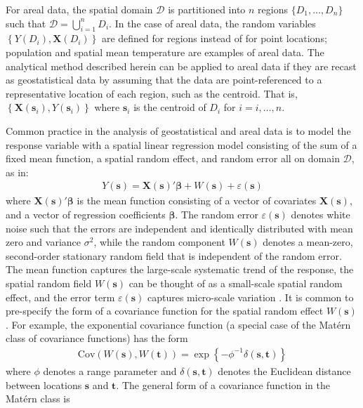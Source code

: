 \documentclass[authoryear, review, 11pt]{elsarticle}
\begin{document}
	For areal data, the spatial domain $\mathcal{D}$ is partitioned into $n$ regions $\{D_1, \dots, D_n\}$ such that $\mathcal{D} = \bigcup \limits_{i=1}^nD_i$. In the case of areal data, the random variables $\left\{Y(D_i), \bm{X}(D_i)\right\}$ are defined for regions instead of for point locations; population and spatial mean temperature are examples of areal data. The analytical method described herein can be applied to areal data if they are recast as geostatistical data by assuming that the data are point-referenced to a representative location of each region, such as the centroid. That is, $\left\{\bm{X}(\bm{s}_i), Y(\bm{s}_i)\right\} $ where $\bm{s}_i$ is the centroid of $D_i$ for $i=i, \dots, n$.
	
	 Common practice in the analysis of geostatistical and areal data is to model the response variable with a spatial linear regression model consisting of the sum of a fixed mean function, a spatial random effect, and random error all on domain $\mathcal{D}$, as in: 
\begin{align}\label{eq:spatial-regression}
    Y(\bm{s}) = \bm{X}(\bm{s})'\bm{\beta} + W(\bm{s}) + \varepsilon(\bm{s})
\end{align}
where $\bm{X}(\bm{s})'\bm{\beta}$ is the mean function consisting of a vector of covariates $\bm{X}(\bm{s})$, and a vector of regression coefficients $\bm{\beta}$. The random error $\varepsilon(\bm{s})$ denotes white noise such that the errors are independent and identically distributed with mean zero and variance $\sigma^2$, while the random component $W(\bm{s})$ denotes a mean-zero, second-order stationary random field that is independent of the random error. The mean function captures the large-scale systematic trend of the response, the spatial random field $W(\bm{s})$ can be thought of as a small-scale spatial random effect, and the error term $\varepsilon(\bm{s})$ captures micro-scale variation \citep{Cressie:1993}. It is common to pre-specify the form of a covariance function for the spatial random effect $W(\bm{s})$ \citep{Diggle:2007}. For example, the exponential covariance function (a special case of the Mat\'{e}rn class of covariance functions) has the form
\begin{align}\label{eq:exponential-covariance}
    \text{Cov}(W(\bm{s}), W(\bm{t})) = \exp\left\{-\phi^{-1} \delta(\bm{s}, \bm{t}) \right\}
\end{align}
where $\phi$ denotes a range parameter and $\delta(\bm{s}, \bm{t})$ denotes the Euclidean distance between locations $\bm{s}$ and $\bm{t}$. The general form of a covariance function in the Mat\'{e}rn class is
\end{document}
